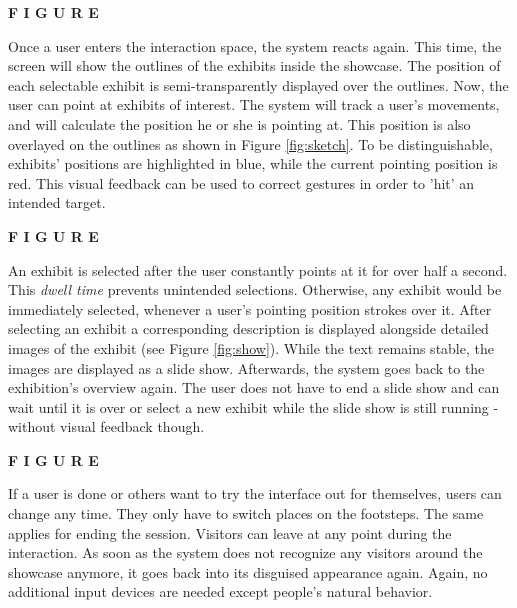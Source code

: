 \textbf{F I G U R E}

Once a user enters the interaction space, the system reacts again. This time, the screen will show the outlines of the exhibits inside the showcase. The position of each selectable exhibit is semi-transparently displayed over the outlines. Now, the user can point at exhibits of interest. The system will track a user's movements, and will calculate the position he or she is pointing at. This position is also overlayed on the outlines as shown in Figure \ref{fig:sketch}. To be distinguishable, exhibits' positions are  highlighted in blue, while the current pointing position is red. This visual feedback can be used to correct gestures in order to 'hit' an intended target.

\textbf{F I G U R E}

An exhibit is selected after the user constantly points at it for over half a second. This \textit{dwell time} prevents unintended selections. Otherwise, any exhibit would be immediately selected, whenever a user's pointing position strokes over it. After selecting an exhibit a corresponding description is displayed alongside detailed images of the exhibit (see Figure \ref{fig:show}). While the text remains stable, the images are displayed as a slide show. Afterwards, the system goes back to the exhibition's overview again. The user does not have to end a slide show and can wait until it is over or select a new exhibit while the slide show is still running - without visual feedback though.

\textbf{F I G U R E}

If a user is done or others want to try the interface out for themselves, users can change any time. They only have to switch places on the footsteps. The same applies for ending the session. Visitors can leave at any point during the interaction. As soon as the system does not recognize any visitors around the showcase anymore, it goes back into its disguised appearance again. Again, no additional input devices are needed except people's natural behavior.

